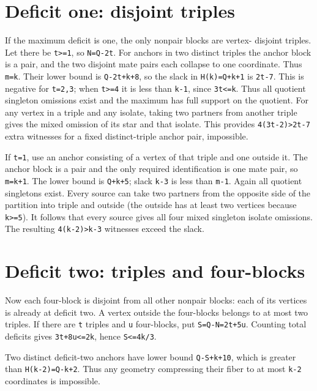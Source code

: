 \documentclass[11pt,letterpaper]{article}
\begin{document}
\section{Deficit one: disjoint
triples}\label{4-deficit-one-disjoint-triples}

If the maximum deficit is one, the only nonpair blocks are vertex-
disjoint triples. Let there be \texttt{t\textgreater{}=1}, so
\texttt{N=Q-2t}. For anchors in two distinct triples the anchor block is
a pair, and the two disjoint mate pairs each collapse to one coordinate.
Thus \texttt{m=k}. Their lower bound is \texttt{Q-2t+k+8}, so the slack
in \texttt{H(k)=Q+k+1} is \texttt{2t-7}. This is negative for
\texttt{t=2,3}; when \texttt{t\textgreater{}=4} it is less than
\texttt{k-1}, since \texttt{3t\textless{}=k}. Thus all quotient
singleton omissions exist and the maximum has full support on the
quotient. For any vertex in a triple and any isolate, taking two
partners from another triple gives the mixed omission of its star and
that isolate. This provides \texttt{4(3t-2)\textgreater{}2t-7} extra
witnesses for a fixed distinct-triple anchor pair, impossible.

If \texttt{t=1}, use an anchor consisting of a vertex of that triple and
one outside it. The anchor block is a pair and the only required
identification is one mate pair, so \texttt{m=k+1}. The lower bound is
\texttt{Q+k+5}; slack \texttt{k-3} is less than \texttt{m-1}. Again all
quotient singletons exist. Every source can take two partners from the
opposite side of the partition into triple and outside (the outside has
at least two vertices because \texttt{k\textgreater{}=5}). It follows
that every source gives all four mixed singleton isolate omissions. The
resulting \texttt{4(k-2)\textgreater{}k-3} witnesses exceed the slack.

\section{Deficit two: triples and
four-blocks}\label{5-deficit-two-triples-and-four-blocks}

Now each four-block is disjoint from all other nonpair blocks: each of
its vertices is already at deficit two. A vertex outside the four-blocks
belongs to at most two triples. If there are \texttt{t} triples and
\texttt{u} four-blocks, put \texttt{S=Q-N=2t+5u}. Counting total
deficits gives \texttt{3t+8u\textless{}=2k}, hence
\texttt{S\textless{}=4k/3}.

Two distinct deficit-two anchors have lower bound \texttt{Q-S+k+10},
which is greater than \texttt{H(k-2)=Q-k+2}. Thus any geometry
compressing their fiber to at most \texttt{k-2} coordinates is
impossible.
\end{document}
